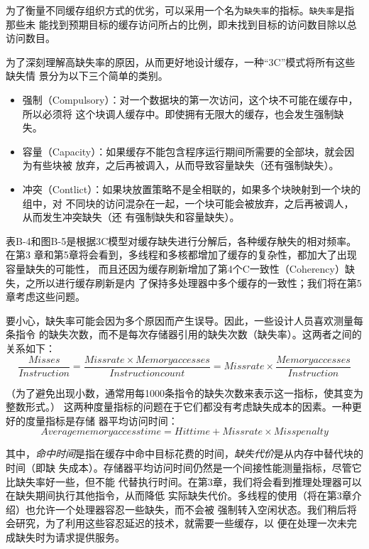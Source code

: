 为了衡量不同缓存组织方式的优劣，可以采用一个名为\verb|缺失率|的指标。\verb|缺失率|是指那些未
能找到预期目标的缓存访问所占的比例，即未找到目标的访问数目除以总访问数目。

为了深刻理解高缺失率的原因，从而更好地设计缓存，一种“3C”模式将所有这些缺失情
景分为以下三个简单的类别。

\begin{itemize}
    \item 强制（Compulsory）：对一个数据块的第一次访问，这个块不可能在缓存中，所以必须将
    这个块调人缓存中。即使拥有无限大的缓存，也会发生强制缺失。
    \item 容量（Capacity）：如果缓存不能包含程序运行期间所需要的全部块，就会因为有些块被
    放弃，之后再被调入，从而导致容量缺失（还有强制缺失）。
    \item 冲突（Contlict）：如果块放置策略不是全相联的，如果多个块映射到一个块的组中，对
    不同块的访问混杂在一起，一个块可能会被放弃，之后再被调人，从而发生冲突缺失（还
    有强制缺失和容量缺失）。
\end{itemize}

表B-4和图B-5是根据3C模型对缓存缺失进行分解后，各种缓存觖失的相对频率。在第3
章和第5章将会看到，多线程和多核都增加了缓存的复杂性，都加大了出现容量缺失的可能性，
而且还因为缓存刷新增加了第4个C\dash 一致性（Coherency）缺失，之所以进行缓存刷新是内
了保持多处理器中多个缓存的一致性；我们将在第5章考虑这些问题。

要小心，缺失率可能会因为多个原因而产生误导。因此，一些设计人员喜欢测量每条指令
的缺失次数，而不是每次存储器引用的缺失次数（缺失率）。这两者之间的关系如下：
\begin{equation}
    \frac{Misses}{Instruction} = \frac{Miss rate \times Memory accesses}{Instruction count} = Miss rate \times \frac{Memory accesses}{Instruction}
\end{equation}

（为了避免出现小数，通常用每1000条指令的缺失次数来表示这一指标，使其变为整数形式。）
这两种度量指标的问题在于它们都没有考虑缺失成本的因素。一种更好的度量指标是存储
器平均访问时间：
\begin{equation}    
    Average memory access time = Hit time + Miss rate \times Miss penalty
\end{equation}

其中，\emph{命中时间}是指在缓存中命中目标花费的时间，\emph{缺失代价}是从内存中替代块的时间（即缺
失成本）。存储器平均访问时间仍然是一个间接性能测量指标，尽管它比缺失率好一些，但不能
代替执行时间。在第3章，我们将会看到推理处理器可以在缺失期间执行其他指令，从而降低
实际缺失代价。多线程的使用（将在第3章介绍）也允许一个处理器容忍一些缺失，而不会被
强制转入空闲状态。我们稍后将会研究，为了利用这些容忍延迟的技术，就需要一些缓存，以
便在处理一次未完成缺失时为请求提供服务。

